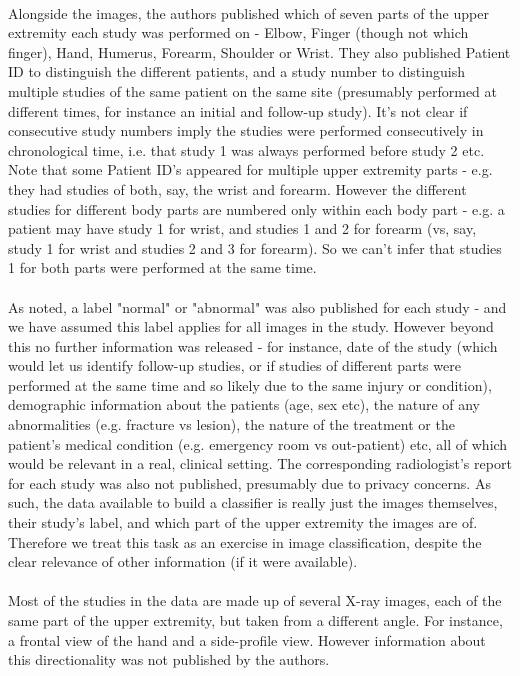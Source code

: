 \documentclass[11pt]{article} %
\theoremstyle{plain}
\theoremstyle{definition}
\begin{document}
\\
\noindent
Alongside the images, the authors published which of seven parts of the upper extremity each study was performed on - Elbow, Finger (though not which finger), Hand, Humerus, Forearm, Shoulder or Wrist. They also published Patient ID to distinguish the different patients, and a study number to distinguish multiple studies of the same patient on the same site (presumably performed at different times, for instance an initial and follow-up study). It's not clear if consecutive study numbers imply the studies were performed consecutively in chronological time, i.e. that study 1 was always performed before study 2 etc. Note that some Patient ID's appeared for multiple upper extremity parts - e.g. they had studies of both, say, the wrist and forearm. However the different studies for different body parts are numbered only within each body part - e.g. a patient may have study 1 for wrist, and studies 1 and 2 for forearm (vs, say, study 1 for wrist and studies 2 and 3 for forearm). So we can't infer that studies 1 for both parts were performed at the same time. 
\\
\\
\noindent
As noted, a label "normal" or "abnormal" was also published for each study - and we have assumed this label applies for all images in the study. However beyond this no further information was released - for instance, date of the study (which would let us identify follow-up studies, or if studies of different parts were performed at the same time and so likely due to the same injury or condition), demographic information about the patients (age, sex etc), the nature of any abnormalities (e.g. fracture vs lesion), the nature of the treatment or the patient's medical condition (e.g. emergency room vs out-patient) etc, all of which would be relevant in a real, clinical setting. The corresponding radiologist's report for each study was also not published, presumably due to privacy concerns. As such, the data available to build a classifier is really just the images themselves, their study's label, and which part of the upper extremity the images are of. Therefore we treat this task as an exercise in image classification, despite the clear relevance of other information (if it were available).
\\
\\
\noindent
Most of the studies in the data are made up of several X-ray images, each of the same part of the upper extremity, but taken from a different angle. For instance, a frontal view of the hand and a side-profile view. However information about this directionality was not published by the authors. 
\end{document}
